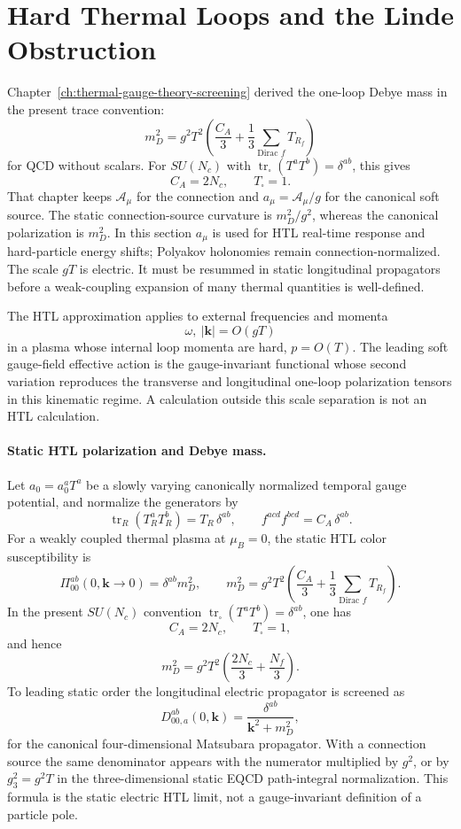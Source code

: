 \section{Hard Thermal Loops and the Linde Obstruction}
\label{sec:qcd-phase-hard-thermal-loops-linde}

Chapter~\ref{ch:thermal-gauge-theory-screening} derived the one-loop Debye
mass in the present trace convention:
\[
  m_D^2
  =
  g^2T^2\left(
  \frac{C_A}{3}
  +\frac{1}{3}\sum_{\text{Dirac }f}T_{R_f}
  \right)
\]
for QCD without scalars.  For \(SU(N_c)\) with
\(\operatorname{tr}_{\square}(T^aT^b)=\delta^{ab}\), this gives
\[
  C_A=2N_c,\qquad T_{\square}=1.
\]
That chapter keeps \(\mathcal A_\mu\) for the connection and
\(a_\mu=\mathcal A_\mu/g\) for the canonical soft source.  The static
connection-source curvature is \(m_D^2/g^2\), whereas the canonical
polarization is \(m_D^2\).  In this section \(a_\mu\) is used for HTL
real-time response and hard-particle energy shifts; Polyakov holonomies remain
connection-normalized.
The scale \(gT\) is electric.  It must be resummed in static longitudinal
propagators before a weak-coupling expansion of many thermal quantities is
well-defined.

\begin{controlledapproximation}
\label{ca:qcd-htl-regime}
The HTL approximation applies to external frequencies and momenta
\[
  \omega,\ |\mathbf k| = O(gT)
\]
in a plasma whose internal loop momenta are hard, \(p=O(T)\).  The leading
soft gauge-field effective action is the gauge-invariant functional whose
second variation reproduces the transverse and longitudinal one-loop
polarization tensors in this kinematic regime.  A calculation outside this
scale separation is not an HTL calculation.
\end{controlledapproximation}

\paragraph{Static HTL polarization and Debye mass.}
Let \(a_0=a_0^aT^a\) be a slowly varying canonically normalized temporal
gauge potential, and normalize the generators by
\[
  \operatorname{tr}_R(T_R^aT_R^b)=T_R\,\delta^{ab},\qquad
  f^{acd}f^{bcd}=C_A\,\delta^{ab}.
\]
For a weakly coupled thermal plasma at \(\mu_B=0\), the static HTL color
susceptibility is
\[
  \Pi_{00}^{ab}(0,\mathbf k\to0)
  =
  \delta^{ab}m_D^2,
  \qquad
  m_D^2
  =
  g^2T^2\left(\frac{C_A}{3}
  +\frac{1}{3}\sum_{\text{Dirac }f}T_{R_f}\right).
\]
In the present \(SU(N_c)\) convention
\(\operatorname{tr}_{\square}(T^aT^b)=\delta^{ab}\), one has
\[
  C_A=2N_c,\qquad T_{\square}=1,
\]
and hence
\[
  m_D^2=g^2T^2\left(\frac{2N_c}{3}+\frac{N_f}{3}\right).
\]
To leading static order the longitudinal electric propagator is screened as
\[
  D_{00,a}^{ab}(0,\mathbf k)
  =
  \frac{\delta^{ab}}{\mathbf k^2+m_D^2},
\]
for the canonical four-dimensional Matsubara propagator.  With a connection
source the same denominator appears with the numerator multiplied by \(g^2\),
or by \(g_3^2=g^2T\) in the three-dimensional static EQCD path-integral
normalization.  This formula is the static electric HTL limit, not a
gauge-invariant definition of a particle pole.

